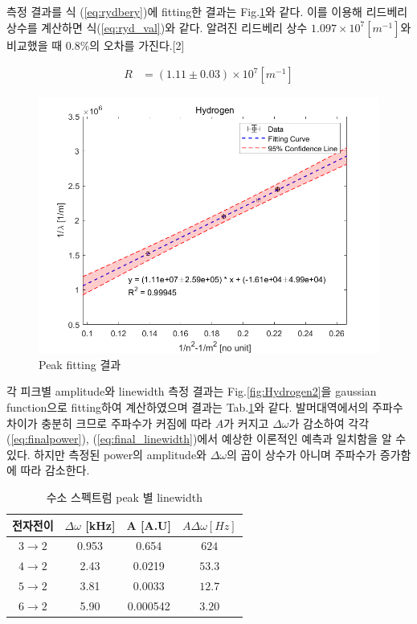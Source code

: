\documentclass[%
 reprint,
 amsmath,amssymb,
 aps,
]{revtex4-2}
\begin{document}
측정 결과를 식 (\ref{eq:rydbery})에 fitting한 결과는 Fig.\ref{fig:Rydbery}와 같다. 이를 이용해 리드베리 상수를 계산하면 식(\ref{eq:ryd_val})와 같다. 알려진 리드베리 상수 $1.097\times 10^{7}[m^{-1}]$와 비교했을 때 $0.8\%$의 오차를 가진다.[2]

\begin{align}
	R &= (1.11\pm0.03)\times 10^{7}[m^{-1}]\label{eq:ryd_val}
\end{align}

\begin{figure}[htbp]
	\includegraphics[width = 0.95\linewidth]{Rydbery.png}%
	\caption{\label{fig:Rydbery}Peak fitting 결과}
\end{figure}

각 피크별 amplitude와 linewidth 측정 결과는 Fig.\ref{fig:Hydrogen2}을 gaussian function으로 fitting하여 계산하였으며 결과는 Tab.\ref{tab:linewidth}와 같다. 발머대역에서의 주파수 차이가 충분히 크므로 주파수가 커짐에 따라 $A$가 커지고 $\Delta \omega$가 감소하여 각각 (\ref{eq:finalpower}), (\ref{eq:final_linewidth})에서 예상한 이론적인 예측과 일치함을 알 수 있다. 하지만 측정된 power의 amplitude와 $\Delta \omega$의 곱이 상수가 아니며 주파수가 증가함에 따라 감소한다.

\begin{table}[]
\begin{tabular}{c|c|c|c} \hline \hline
전자전이 & $\Delta \omega$ [kHz] & A [A.U] & $A \Delta\omega [Hz]$ \\ \hline
$3\rightarrow 2$& 0.953 & 0.654 & $624$\\ \hline
$4\rightarrow 2$& 2.43 & 0.0219 & $53.3$\\ \hline
$5\rightarrow 2$& 3.81 & 0.0033 & $12.7$\\ \hline
$6\rightarrow 2$& 5.90 & 0.000542 & $3.20$\\ \hline
\end{tabular}
\caption{\label{tab:linewidth}수소 스펙트럼 peak 별 linewidth}
\end{table}
\end{document}
